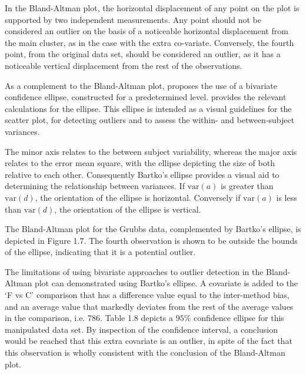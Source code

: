 \documentclass[12pt, a4paper]{report}
\theoremstyle{plain}
\theoremstyle{definition}
\theoremstyle{remark}
\begin{document}
		In the Bland-Altman plot, the horizontal displacement of any point on the plot is supported by two independent measurements. Any point should not be considered an outlier on the basis of a noticeable horizontal displacement from the main cluster, as in the case with the extra co-variate. Conversely, the fourth point, from the original data set, should be considered an
		outlier, as it has a noticeable vertical displacement from the rest of the observations.
			
	As a complement to the Bland-Altman plot, \citet{Bartko} proposes
	the use of a bivariate confidence ellipse, constructed for a
	predetermined level. \citet{AltmanEllipse} provides the relevant calculations for the
	ellipse. This ellipse is intended as a visual
	guidelines for the scatter plot, for detecting outliers and to
	assess the within- and between-subject variances.
	
	The minor axis relates to the between subject variability, whereas
	the major axis relates to the error mean square, with the ellipse
	depicting the size of both relative to each other.
	Consequently Bartko's ellipse provides a visual aid to determining the
	relationship between variances. If $\mbox{var}(a)$ is greater than $\mbox{var}(d)$, the orientation of the ellipse is horizontal. Conversely if $\mbox{var}(a)$ is less than $\mbox{var}(d)$, the orientation of the ellipse is vertical.
	
	
	
	The Bland-Altman plot for the Grubbs data, complemented by Bartko's ellipse, is depicted in Figure 1.7.
	The fourth observation is shown to be outside the bounds of the ellipse, indicating that it is a potential outlier.
	
	
	
	The limitations of using bivariate approaches to outlier detection
	in the Bland-Altman plot can demonstrated using Bartko's ellipse.
	A covariate is added to the `F vs C' comparison that has a
	difference value equal to the inter-method bias, and an average
	value that markedly deviates from the rest of the average values
	in the comparison, i.e. 786. Table 1.8 depicts a $95\%$ confidence
	ellipse for this manipulated data set. By inspection of the
	confidence interval, a conclusion would be reached that this extra
	covariate is an outlier, in spite of the fact that this
	observation is wholly consistent with the conclusion of the
	Bland-Altman plot.
	
\end{document}

